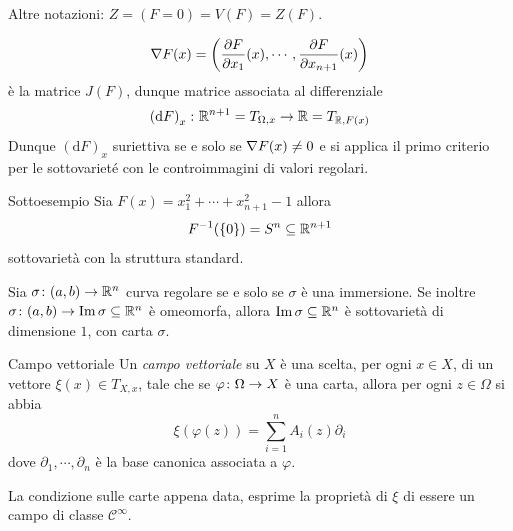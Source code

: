 \documentclass[a4paper]{article}
\begin{document}
Altre notazioni: \(Z = (F=0) = V(F) = Z(F)\).

\begin{snippetproof}{}
    \[
        \nabla F(x) = \left(
            \frac{\partial F}{\partial x_1}(x),
            \cdots,
            \frac{\partial F}{\partial x_{n+1}}(x)
        \right)
    \]
    è la matrice \(J(F)\), dunque matrice associata al differenziale
    \[
        \left(\text{d}F\right)_x \colon \mathbb{R}^{n+1} = T_{\Omega, x} \to \mathbb{R} = T_{\mathbb{R}, F(x)}
    \]
    Dunque \(\left(\text{d}F\right)_x\) suriettiva se e solo se \(\nabla F(x) \neq 0\)
    e si applica il primo criterio per le sottovarieté con le controimmagini di valori regolari.
\end{snippetproof}

\begin{snippetexample}{Sottoesempio}
    Sia \(F(x) = x_1^2 + \cdots + x_{n+1}^2 - 1\)
    allora
    \[
        F^{-1}(\{0\}) = S^n \subseteq \mathbb{R}^{n+1}
    \]
    sottovarietà con la struttura standard.
\end{snippetexample}

\begin{snippetexample}{}
    Sia \(\sigma \colon (a,b) \to \mathbb{R}^n\)
    curva regolare se e solo se \(\sigma\) è una immersione.
    Se inoltre \(\sigma \colon (a,b) \to \operatorname{Im}\sigma \subseteq \mathbb{R}^n\)
    è omeomorfa, allora \(\operatorname{Im}\sigma \subseteq \mathbb{R}^n\)
    è sottovarietà di dimensione \(1\), con carta \(\sigma\).
\end{snippetexample}

\begin{snippetdefinition}{Campo vettoriale}
    Un \emph{campo vettoriale} su \(X\) è una scelta, per ogni \(x \in X\),
    di un vettore \(\xi(x) \in T_{X,x}\), tale che se \(\varphi \colon \Omega \to X\)
    è una carta, allora per ogni \(z \in \Omega\) si abbia
    \[
        \xi(\varphi(z)) = \sum_{i=1}^n A_i(z)\partial_i
    \]
    dove \(\partial_1, \cdots, \partial_n\) è la base canonica associata a \(\varphi\).
\end{snippetdefinition}

La condizione sulle carte appena data, esprime la proprietà di \(\xi\)
di essere un campo di classe \(\mathcal C^\infty\).

\begin{center}
\end{center}
\end{document}
